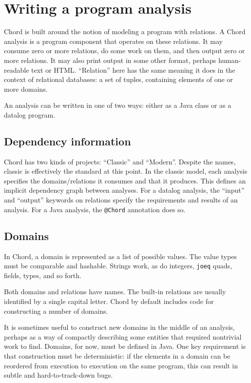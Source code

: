 \section{Writing a program analysis}
\label{sec:writing-analysis}

Chord is built around the notion of modeling a program with relations.
A Chord analysis is a program component that operates on these relations.
It may consume zero or more relations, do some work on them, and then output zero or more relations.
It may also print output in some other format, perhaps human-readable text or HTML.
``Relation'' here has the same meaning it does in the context of relational databases: a set of tuples, containing elements of one or more domains.  


An analysis can be written in one of two ways: either as a Java class or as a datalog program. 

\subsection{Dependency information}

Chord has two kinds of projects: ``Classic'' and ``Modern''.  Despite the names, classic is effectively the standard at this point.
In the classic model, each analysis specifies the domains/relations it consumes and that it produces.
This defines an implicit dependency graph between analyses.  For a datalog analysis, the ``input'' and ``output'' keywords on relations specify the requirements and results of an analysis.  For a Java analysis, the \texttt{@Chord} annotation does so. 



\subsection{Domains}

In Chord, a domain is represented as a list of possible values. 
The value types must be comparable and hashable.
Strings work, as do integers, \texttt{joeq} quads, fields, types, and so forth. 
%

Both domains and relations have names. The built-in relations are usually identified by a single capital letter.
Chord by default includes code for constructing a number of domains.

It is sometimes useful to construct new domains in the middle of an analysis, perhaps as a way of compactly describing some entities that required nontrivial work to find. Domains, for now, must be defined in Java. One key requirement is that construction must be deterministic: if the elements in a domain can be reordered from execution to execution on the same program, this can result in subtle and hard-to-track-down bugs.


